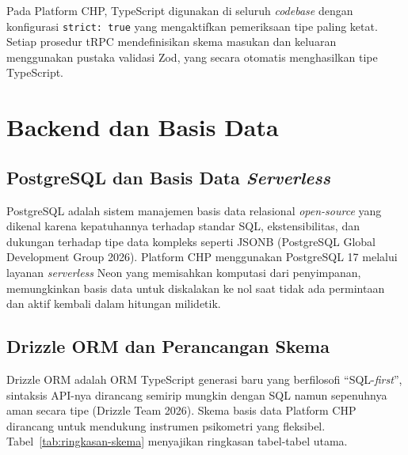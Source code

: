 Pada Platform CHP, TypeScript digunakan di seluruh \textit{codebase} dengan konfigurasi \texttt{strict: true} yang mengaktifkan pemeriksaan tipe paling ketat. Setiap prosedur tRPC mendefinisikan skema masukan dan keluaran menggunakan pustaka validasi Zod, yang secara otomatis menghasilkan tipe TypeScript.

\section{Backend dan Basis Data}
\label{sec:backend-db}

\subsection{PostgreSQL dan Basis Data \textit{Serverless}}
\label{subsec:postgresql}

PostgreSQL adalah sistem manajemen basis data relasional \textit{open-source} yang dikenal karena kepatuhannya terhadap standar SQL, ekstensibilitas, dan dukungan terhadap tipe data kompleks seperti JSONB (PostgreSQL Global Development Group 2026). Platform CHP menggunakan PostgreSQL 17 melalui layanan \textit{serverless} Neon yang memisahkan komputasi dari penyimpanan, memungkinkan basis data untuk diskalakan ke nol saat tidak ada permintaan dan aktif kembali dalam hitungan milidetik.

\subsection{Drizzle ORM dan Perancangan Skema}
\label{subsec:drizzle}

Drizzle ORM adalah ORM TypeScript generasi baru yang berfilosofi ``SQL-\textit{first}'', sintaksis API-nya dirancang semirip mungkin dengan SQL namun sepenuhnya aman secara tipe (Drizzle Team 2026). Skema basis data Platform CHP dirancang untuk mendukung instrumen psikometri yang fleksibel. Tabel~\ref{tab:ringkasan-skema} menyajikan ringkasan tabel-tabel utama.

